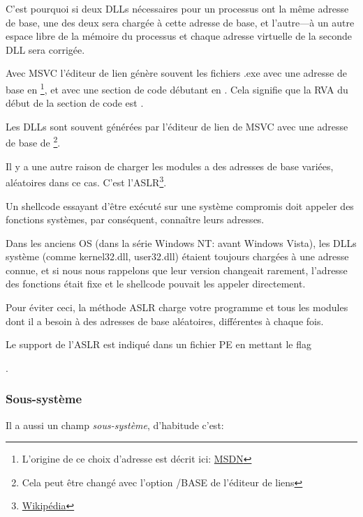 C'est pourquoi si deux DLLs nécessaires pour un processus ont la même adresse de base,
une des deux sera chargée à cette adresse de base, et l'autre---à un autre espace
libre de la mémoire du processus et chaque adresse virtuelle de la seconde DLL sera
corrigée.

\par Avec \ac{MSVC} l'éditeur de lien génère souvent les fichiers .exe avec une adresse
de base en \footnote{L'origine de ce choix d'adresse est décrit ici:
\href{http://go.yurichev.com/17041}{MSDN}}, et avec une section de code débutant
en .
Cela signifie que la \ac{RVA} du début de la section de code est .

Les DLLs sont souvent générées par l'éditeur de lien de MSVC avec une adresse de
base de \footnote{Cela peut être changé avec l'option /BASE de l'éditeur
de liens}.


Il y a une autre raison de charger les modules a des adresses de base variées, aléatoires
dans ce cas. C'est l'\ac{ASLR}\footnote{\href{http://go.yurichev.com/17140}{Wikipédia}}.


Un shellcode essayant d'être exécuté sur une système compromis doit appeler des fonctions
systèmes, par conséquent, connaître leurs adresses.

Dans les anciens \ac{OS} (dans la série \gls{Windows NT}: avant Windows Vista), les
DLLs système (comme kernel32.dll, user32.dll) étaient toujours chargées à une adresse
connue, et si nous nous rappelons que leur version changeait rarement, l'adresse
des fonctions était fixe et le shellcode pouvait les appeler directement.

Pour éviter ceci, la méthode \ac{ASLR} charge votre programme et tous les modules
dont il a besoin à des adresses de base aléatoires, différentes à chaque fois.

Le support de l'\ac{ASLR} est indiqué dans un fichier PE en mettant le flag
\par {} .

\subsubsection{Sous-système}

Il a aussi un champ \emph{sous-système}, d'habitude c'est:

